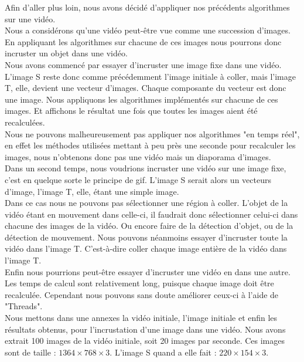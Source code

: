 Afin d'aller plus loin, nous avons décidé d'appliquer nos précédents algorithmes sur une vidéo. \\
Nous a considérons qu'une vidéo  peut-être vue comme une succession d'images. En appliquant les algorithmes sur chacune de ces images nous pourrons donc incruster un objet dans une vidéo. \\
Nous avons commencé par essayer d'incruster une image fixe dans une vidéo. 
L'image S reste donc comme précédemment l'image initiale à coller, mais l'image T, elle, devient une vecteur d'images. Chaque composante du vecteur est donc une image. Nous appliquons les algorithmes implémentés sur chacune de ces images. Et affichons le résultat une fois que toutes les images aient été recalculées. \\ Nous ne pouvons malheureusement pas appliquer nos algorithmes "en temps réel", en effet les méthodes utilisées mettant à peu près une seconde pour recalculer les images, nous n'obtenons donc pas une vidéo mais un diaporama d'images. \\
Dans un second temps, nous voudrions incruster une vidéo sur une image fixe, c'est en quelque sorte le principe de gif. L'image S serait alors un vecteurs d'image, l'image T, elle, étant une simple image. \\ Dans ce cas nous ne pouvons pas sélectionner une région à coller. L'objet de la vidéo étant en mouvement dans celle-ci, il faudrait donc sélectionner celui-ci dans chacune des images de la vidéo. Ou encore faire de la détection d'objet, ou de la détection de mouvement. Nous pouvons néanmoins essayer d'incruster toute la vidéo dans l'image T.  C'est-à-dire coller chaque image entière de la vidéo dans l'image T.\\
Enfin nous pourrions peut-être essayer d'incruster une vidéo en dans une autre. \\
Les temps de calcul sont relativement long, puisque chaque image doit être recalculée. Cependant nous pouvons sans doute améliorer ceux-ci à l'aide de "Threads". \\
Nous mettons dans une annexes la vidéo initiale, l'image initiale et enfin les résultats obtenus, pour l'incrustation d'une image dans une vidéo. 
Nous avons extrait 100 images de la vidéo initiale, soit 20 images par seconde. Ces images sont de taille : $1364 \times 768 \times 3$.  L'image S quand a elle fait : $220 \times 154 \times 3$.
